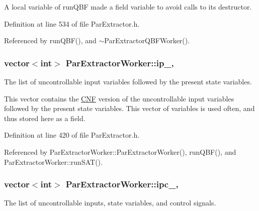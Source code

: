 A local variable of run\-Q\-B\-F made a field variable to avoid calls to its destructor. 



Definition at line 534 of file Par\-Extractor.\-h.



Referenced by run\-Q\-B\-F(), and $\sim$\-Par\-Extractor\-Q\-B\-F\-Worker().

\hypertarget{classParExtractorWorker_ab1385a3c5d2f203f6a1dbaf1ed6b5fcd}{
\subsubsection[{ip\-\_\-}]{\setlength{\rightskip}{0pt plus 5cm}vector$<$int$>$ Par\-Extractor\-Worker\-::ip\-\_\-\hspace{0.3cm}{\ttfamily [protected]}, {\ttfamily [inherited]}}}\label{classParExtractorWorker_ab1385a3c5d2f203f6a1dbaf1ed6b5fcd}


The list of uncontrollable input variables followed by the present state variables. 

This vector contains the \hyperlink{classCNF}{C\-N\-F} version of the uncontrollable input variables followed by the present state variables. This vector of variables is used often, and thus stored here as a field. 

Definition at line 420 of file Par\-Extractor.\-h.



Referenced by Par\-Extractor\-Worker\-::\-Par\-Extractor\-Worker(), run\-Q\-B\-F(), and Par\-Extractor\-Worker\-::run\-S\-A\-T().

\hypertarget{classParExtractorWorker_ae9deb9eac6b36f87f299d1eca77351d5}{
\subsubsection[{ipc\-\_\-}]{\setlength{\rightskip}{0pt plus 5cm}vector$<$int$>$ Par\-Extractor\-Worker\-::ipc\-\_\-\hspace{0.3cm}{\ttfamily [protected]}, {\ttfamily [inherited]}}}\label{classParExtractorWorker_ae9deb9eac6b36f87f299d1eca77351d5}


The list of uncontrollable inputs, state variables, and control signals. 

